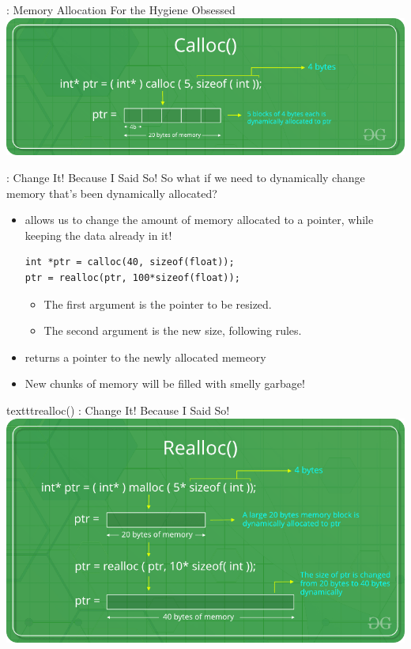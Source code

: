 \documentclass[11pt]{beamer}
\let\OldTexttt\texttt
\renewcommand{\texttt}[1]{\OldTexttt{\color{teal}{#1}}}
\begin{document}
\begin{frame}{\texttt{calloc()} : Memory Allocation For the Hygiene Obsessed}
\center
\includegraphics[scale=0.35]{calloc-function-in-c.png}
\end{frame}

\begin{frame}[fragile=singleslide]{\texttt{realloc()} : Change It! Because I Said So!}
So what if we need to dynamically change memory that's been dynamically allocated? 
\begin{itemize}
\item \texttt{realloc()} allows us to change the amount of memory allocated to a pointer, while keeping the data already in it! 
\begin{lstlisting}[style = C]
int *ptr = calloc(40, sizeof(float));
ptr = realloc(ptr, 100*sizeof(float));
\end{lstlisting}
\begin{itemize}
\item The first argument is the pointer to be resized.
\item The second argument is the new size, following \texttt{malloc()} rules.  
\end{itemize}
\item \texttt{realloc()} returns a pointer to the newly allocated memeory
\item New chunks of memory will be filled with smelly garbage! 
\end{itemize}
\end{frame}

\begin{frame}{texttt{realloc()} : Change It! Because I Said So!}
\center
\includegraphics[scale=0.35]{realloc-function-in-c.png}
\end{frame}
\end{document}
